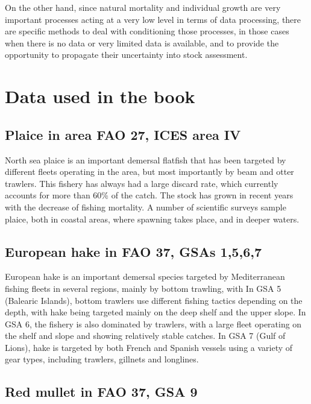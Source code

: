 \documentclass[
]{book}
\begin{document}
On the other hand, since natural mortality and individual growth are very important processes acting at a very low level in terms of data processing, there are specific methods to deal with conditioning those processes, in those cases when there is no data or very limited data is available, and to provide the opportunity to propagate their uncertainty into stock assessment.

\hypertarget{data-used-in-the-book}{%
\section{Data used in the book}\label{data-used-in-the-book}}

\hypertarget{plaice-in-area-fao-27-ices-area-iv}{%
\subsection{Plaice in area FAO 27, ICES area IV}\label{plaice-in-area-fao-27-ices-area-iv}}

North sea plaice is an important demersal flatfish that has been targeted by different fleets operating in the area, but most importantly by beam and otter trawlers. This fishery has always had a large discard rate, which currently accounts for more than 60\% of the catch. The stock has grown in recent years with the decrease of fishing mortality. A number of scientific surveys sample plaice, both in coastal areas, where spawning takes place, and in deeper waters.

\hypertarget{european-hake-in-fao-37-gsas-1567}{%
\subsection{European hake in FAO 37, GSAs 1,5,6,7}\label{european-hake-in-fao-37-gsas-1567}}

European hake is an important demersal species targeted by Mediterranean fishing fleets in several regions, mainly by bottom trawling, with In GSA 5 (Balearic Islands), bottom trawlers use different fishing tactics depending on the depth, with hake being targeted mainly on the deep shelf and the upper slope. In GSA 6, the fishery is also dominated by trawlers, with a large fleet operating on the shelf and slope and showing relatively stable catches. In GSA 7 (Gulf of Lions), hake is targeted by both French and Spanish vessels using a variety of gear types, including trawlers, gillnets and longlines.

\hypertarget{red-mullet-in-fao-37-gsa-9}{%
\subsection{Red mullet in FAO 37, GSA 9}\label{red-mullet-in-fao-37-gsa-9}}
\end{document}

